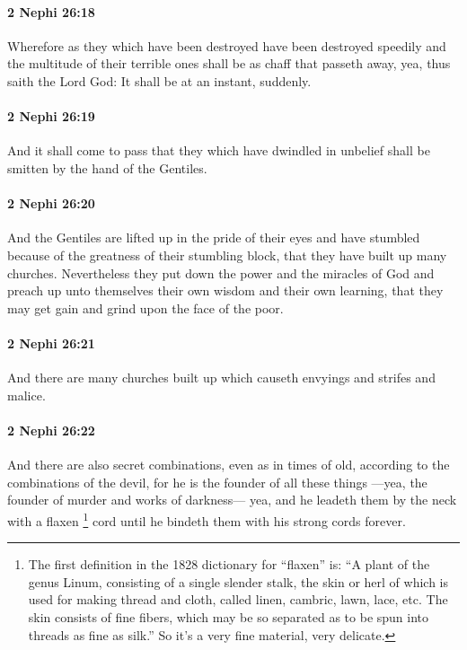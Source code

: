 		\paragraph{2 Nephi 26:18} %
			\label{2NEPHI-26-18}

			Wherefore as they which have been destroyed have been destroyed speedily
			and the multitude of their terrible ones shall be as chaff that passeth away,
			yea, thus saith the Lord God:
			It shall be at an instant, suddenly.

		\paragraph{2 Nephi 26:19} %
			\label{2NEPHI-26-19}

			And it shall come to pass that they which have dwindled in unbelief
			shall be smitten by the hand of the Gentiles.

		\paragraph{2 Nephi 26:20} %
			\label{2NEPHI-26-20}

			And the Gentiles are lifted up in the pride of their eyes
			and have stumbled because of the greatness of their stumbling block,
			that they have built up many churches.
			Nevertheless they put down the power and the miracles of God
			and preach up unto themselves their own wisdom and their own learning,
			that they may get gain and grind upon the face of the poor.

		\paragraph{2 Nephi 26:21} %
			\label{2NEPHI-26-21}

			And there are many churches built up
			which causeth envyings and strifes and malice.

		\paragraph{2 Nephi 26:22} %
			\label{2NEPHI-26-22}

			And there are also secret combinations, even as in times of old,
			according to the combinations of the devil,
			for he is the founder of all these things
			---yea, the founder of murder and works of darkness---
			yea, and he leadeth them by the neck with a flaxen%
				\footnote{%
					The first definition in the 1828 dictionary for ``flaxen'' is: ``A plant of the genus Linum, consisting of a single slender stalk, the skin or herl of which is used for making thread and cloth, called linen, cambric, lawn, lace, etc. The skin consists of fine fibers, which may be so separated as to be spun into threads as fine as silk.'' So it's a very fine material, very delicate.
					}
			cord
			until he bindeth them with his strong cords forever.

